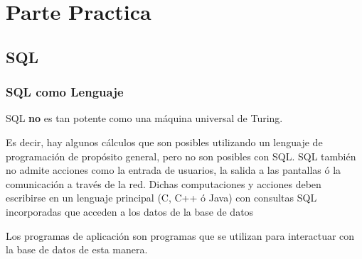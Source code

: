 \documentclass[12pt, fleqn]{report}                             %
\begin{document}
\part{Parte Practica}
\clearpage

    
    \chapter{SQL}

        \clearpage
        \section{SQL como Lenguaje}
            
            SQL \textbf{no} es tan potente como una máquina universal de Turing.

            Es decir, hay algunos cálculos que son posibles utilizando un lenguaje de programación
            de propósito general, pero no son posibles con SQL.
            SQL también no admite acciones como la entrada de usuarios, la salida a las pantallas 
            ó la comunicación a través de la red.
            Dichas computaciones y acciones deben escribirse en un lenguaje principal (C, C++ ó Java)
            con consultas SQL incorporadas que acceden a los datos de la base de datos

            Los programas de aplicación son programas que se utilizan para interactuar con la base de datos de esta manera.



\end{document}
